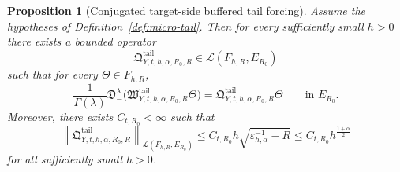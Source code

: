 \documentclass[11pt,a4paper]{amsart}
\theoremstyle{plain}
\newtheorem{proposition}[theorem]{Proposition}
\theoremstyle{definition}
\theoremstyle{remark}
\begin{document}
\begin{proposition}[Conjugated target-side buffered tail forcing]
\label{prop:micro-tail-Y}
Assume the hypotheses of Definition~\ref{def:micro-tail}. Then for every sufficiently small \(h>0\)
there exists a bounded operator
\[
\mathfrak Q_{Y,t,h,\alpha,R_0,R}^{\mathrm{tail}}
\in \mathcal L(F_{h,R},E_{R_0})
\]
such that for every \(\Theta\in F_{h,R}\),
\begin{equation}\label{eq:micro-tail-Y-conj}
\frac{1}{\Gamma(\lambda)}
\mathfrak D_-^\lambda
\bigl(
\mathfrak W_{Y,t,h,\alpha,R_0,R}^{\mathrm{tail}}\Theta
\bigr)
=
\mathfrak Q_{Y,t,h,\alpha,R_0,R}^{\mathrm{tail}}\Theta
\qquad\text{in }E_{R_0}.
\end{equation}
Moreover, there exists \(C_{t,R_0}<\infty\) such that
\begin{equation}\label{eq:micro-tail-Y-bound}
\left\|
\mathfrak Q_{Y,t,h,\alpha,R_0,R}^{\mathrm{tail}}
\right\|_{\mathcal L(F_{h,R},E_{R_0})}
\le
C_{t,R_0}h\sqrt{\varepsilon_{h,\alpha}^{-1}-R}
\le
C_{t,R_0}h^{\frac{1+\alpha}{2}}
\end{equation}
for all sufficiently small \(h>0\).
\end{proposition}
\end{document}
